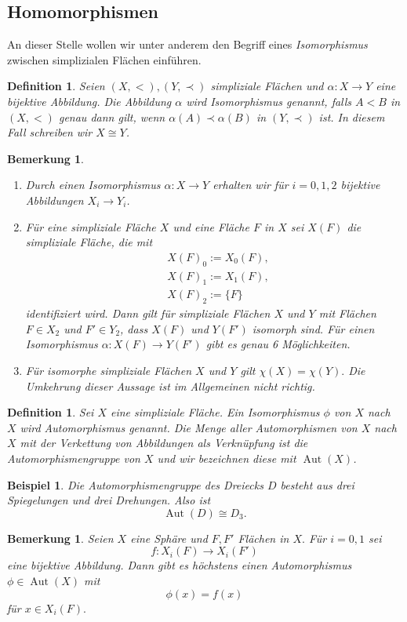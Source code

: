 \documentclass[12pt,titlepage,twoside,cleardoublepage]{article}
\theoremstyle{nummermitklammern}
\newtheorem{bsp}[temp]{Beispiel}
\newtheorem{definition}[temp]{Definition}
\newtheorem{bemerkung}[temp]{Bemerkung}
\newtheorem{definition}[zahl]{Definition}
\newtheorem{bsp}[zahl]{Beispiel}
\newtheorem{bemerkung}[zahl]{Bemerkung}
\numberwithin{equation}{section}
\DeclareMathOperator{\Aut}{Aut}
\begin{document}
\subsection{Homomorphismen}
An dieser Stelle wollen wir unter anderem den Begriff eines \emph{Isomorphismus} zwischen simplizialen Flächen einführen.
\begin{definition} Seien $(X,<),(Y,\prec)$ simpliziale Flächen und $\alpha: X \to Y$ eine bijektive Abbildung. Die Abbildung $\alpha$ wird \emph{Isomorphismus} genannt, falls $A<B$ in $(X,<)$ genau dann gilt, wenn $\alpha(A) \prec \alpha(B)$ in $(Y,\prec)$  ist. In diesem Fall schreiben wir $X \cong Y$.
\end{definition}
\begin{bemerkung}
\begin{enumerate}
\item 
Durch einen Isomorphismus $\alpha:X \to Y$ erhalten wir für $i=0,1,2$  bijektive Abbildungen $X_{i} \to Y_{i}$.
\item
Für eine simpliziale Fläche $X$ und eine Fläche $F$ in $X$ sei $X(F)$ die simpliziale Fläche, die mit 
\begin{align*}
&X(F)_0:=X_0(F),\\
&X(F)_1:= X_1(F),\\
&X(F)_2:= \{F\} 
\end{align*}
 identifiziert wird.
Dann gilt für simpliziale Flächen $X$ und $Y$ mit Flächen $F \in X_2$ und $F' \in Y_2$, dass $X(F)$ und $Y(F')$ isomorph sind. Für einen Isomorphismus $\alpha : X(F)\to Y(F')$ gibt es genau 6 Möglichkeiten.
\item
 Für isomorphe simpliziale Flächen $X$ und $Y$ gilt $\chi(X)=\chi(Y).$
 Die Umkehrung dieser Aussage ist im Allgemeinen nicht richtig.
\end{enumerate}
\end{bemerkung}
\begin{definition}
Sei $X$ eine simpliziale Fläche. Ein Isomorphismus $\phi$ von
$X$ nach $X$ wird \emph{Automorphismus} genannt. Die Menge aller Automorphismen von $X$ nach $X$ mit der Verkettung von Abbildungen als Verknüpfung ist die \emph{Automorphismengruppe} von $X$ und wir bezeichnen diese mit $\Aut(X)$. 
\end{definition}
\begin{bsp}
Die Automorphismengruppe des Dreiecks $D$ besteht aus drei 
Spiegelungen und drei Drehungen. Also ist
\[
\Aut(D)\cong D_3.
\]
\end{bsp}
\begin{bemerkung}
Seien $X$ eine Sphäre und $F,F'$ Flächen in $X.$ Für $i=0,1$ sei 
\[
f:X_i(F)\to X_i(F')  
\] 
eine bijektive Abbildung. Dann gibt es höchstens einen Automorphismus $\phi \in \Aut(X)$ mit 
\[
\phi(x)=f(x) 
\]
für $x\in X_i(F).$
\end{bemerkung}
\end{document}
